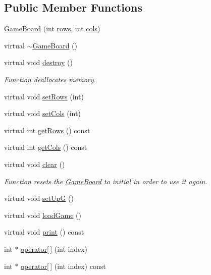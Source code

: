 \subsection*{Public Member Functions}
\begin{DoxyCompactItemize}
\item 
\hyperlink{class_game_board_ac9ffda4dde51341af1315168e8e066a0}{Game\+Board} (int \hyperlink{class_game_board_a83b7f30682f1312a911e036b70c1c6d6}{rows}, int \hyperlink{class_game_board_a95d7d4a10285e01d7a12e94e48090cb7}{cols})
\item 
virtual \hyperlink{class_game_board_ae582b50974ecef2810c63516c104ef83}{$\sim$\+Game\+Board} ()
\item 
virtual void \hyperlink{class_game_board_a891a6e8e8983e6ef4f1a19205392d3ef}{destroy} ()
\begin{DoxyCompactList}\small\item\em Function deallocates memory. \end{DoxyCompactList}\item 
virtual void \hyperlink{class_game_board_ac8b28f17c3ea049f3cb07216b850c4a9}{set\+Rows} (int)
\item 
virtual void \hyperlink{class_game_board_a84673c141f4790940df3aca0e24c3203}{set\+Cols} (int)
\item 
virtual int \hyperlink{class_game_board_a06b193fdd5b618efdbb2700fd7dcffd0}{get\+Rows} () const 
\item 
virtual int \hyperlink{class_game_board_a3e72c802e556c00efd911d95986a4f2e}{get\+Cols} () const 
\item 
virtual void \hyperlink{class_game_board_a85f26da7e1be97961225f8fd893f18ee}{clear} ()
\begin{DoxyCompactList}\small\item\em Function resets the \hyperlink{class_game_board}{Game\+Board} to initial in order to use it again. \end{DoxyCompactList}\item 
virtual void \hyperlink{class_game_board_a81f25c1109558131e0153a4b278cffcb}{set\+Up\+G} ()
\item 
virtual void \hyperlink{class_game_board_ac73c2de2d5a31c591ff3434d8fd38686}{load\+Game} ()
\item 
virtual void \hyperlink{class_game_board_a90f93cc1b6ca4e06f7200696fb21c9b9}{print} () const 
\item 
int $\ast$ \hyperlink{class_game_board_a28a159916f1fb80195bc90f065d040fe}{operator\mbox{[}$\,$\mbox{]}} (int index)
\item 
int $\ast$ \hyperlink{class_game_board_acaedf10ba0c53fc745238d528fe8878b}{operator\mbox{[}$\,$\mbox{]}} (int index) const 
\end{DoxyCompactItemize}
